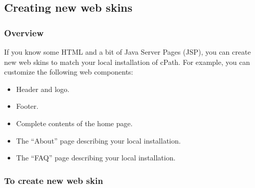 \documentclass[letterpaper,12pt]{article}
\begin{document}
\subsection{Creating new web skins}

\subsubsection{Overview}
If you know some HTML and a bit of Java Server Pages (JSP), you can create new web skins to match your local installation of cPath.  For example, you can customize the following web components:

\begin{itemize}

\item Header and logo.

\item Footer.

\item Complete contents of the home page.

\item The ``About'' page describing your local installation.

\item The ``FAQ'' page describing your local installation.

\end{itemize}

\subsubsection{To create new web skin}
\end{document}
